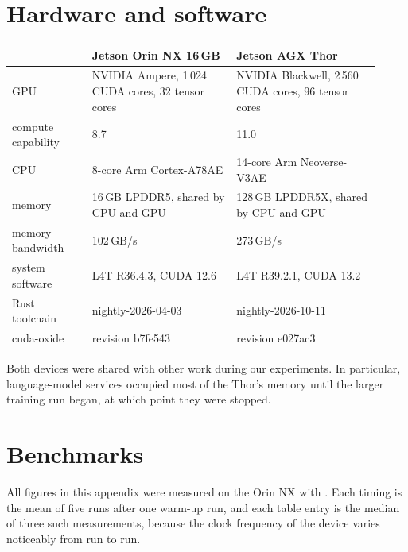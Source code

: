 \appendix

\section{Hardware and software}
\label{sec:appendix-hardware}

\begin{widetable}
\caption{The two devices. Core counts and memory bandwidth are the
manufacturer's specifications; memory capacity, compute capability and
software versions were read from the devices.}
\label{tab:hardware}
\footnotesize
\begin{tabular}{p{0.2\linewidth}p{0.36\linewidth}p{0.36\linewidth}}
\toprule
 & Jetson Orin NX 16\,GB & Jetson AGX Thor \\
\midrule
GPU & NVIDIA Ampere, 1\,024 CUDA cores, 32 tensor cores & NVIDIA Blackwell, 2\,560 CUDA cores, 96 tensor cores \\
compute capability & 8.7 & 11.0 \\
CPU & 8-core Arm Cortex-A78AE & 14-core Arm Neoverse-V3AE \\
memory & 16\,GB LPDDR5, shared by CPU and GPU & 128\,GB LPDDR5X, shared by CPU and GPU \\
memory bandwidth & 102\,GB/s & 273\,GB/s \\
system software & L4T R36.4.3, CUDA 12.6 & L4T R39.2.1, CUDA 13.2 \\
Rust toolchain & nightly-2026-04-03 & nightly-2026-10-11 \\
cuda-oxide & revision b7fe543 & revision e027ac3 \\
\bottomrule
\end{tabular}
\end{widetable}

Both devices were shared with other work during our experiments. In
particular, language-model services occupied most of the Thor's memory until
the larger training run began, at which point they were stopped.

\FloatBarrier
\section{Benchmarks}
\label{sec:appendix-bench}

All figures in this appendix were measured on the Orin NX with
. Each timing is the mean of five runs after one
warm-up run, and each table entry is the median of three such measurements,
because the clock frequency of the device varies noticeably from run to run.

